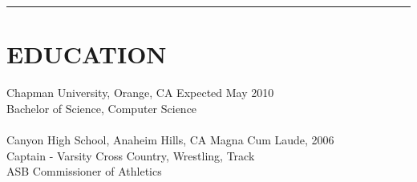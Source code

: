 \documentclass{res}
\begin{document}
 


\address{5205 E. Rolling Hill Drive\\Anaheim, CA 92807\\(714)209-2092}

\address{smith237@mail.chapman.edu\\yasumoto7@gmail.com\\joe@joemsmith.com}

\begin{resume}

\rule{\textwidth}{1pt}

\section{EDUCATION}          
	 Chapman University, Orange, CA \hspace{2.65in} Expected May 2010\\
	 Bachelor of Science, Computer Science \\
	 \\
	 Canyon High School, Anaheim Hills, CA \hspace{2.0in} Magna Cum Laude, 2006\\
	 Captain - Varsity Cross Country, Wrestling, Track\\
	 ASB Commissioner of Athletics


\end{resume}
\end{document}
